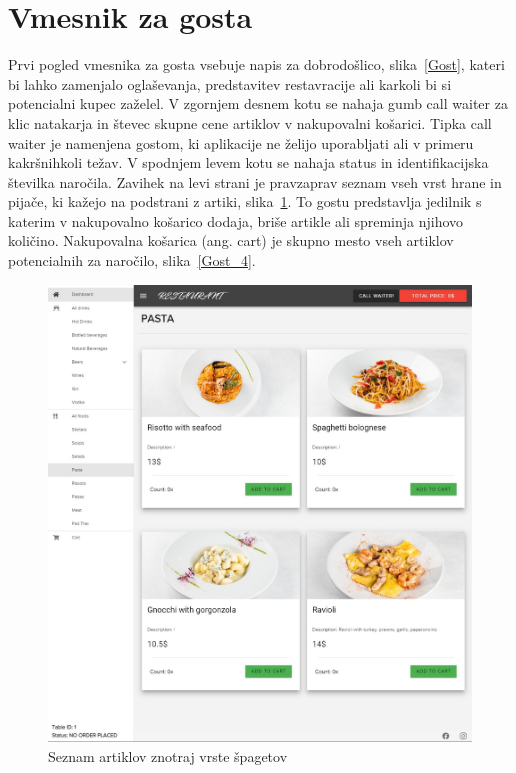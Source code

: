 \documentclass[a4paper, 12pt]{book}
\begin{document}
\section{Vmesnik za gosta}
Prvi pogled vmesnika za gosta vsebuje napis za dobrodošlico, slika~\ref{Gost}, kateri bi lahko zamenjalo oglaševanja, predstavitev restavracije ali karkoli bi si potencialni kupec zaželel. V zgornjem desnem kotu se nahaja gumb call waiter za klic natakarja in števec skupne cene artiklov v nakupovalni košarici. Tipka call waiter je namenjena gostom, ki aplikacije ne želijo uporabljati ali v primeru kakršnihkoli težav. V spodnjem levem kotu se nahaja status in identifikacijska številka naročila. Zavihek na levi strani je pravzaprav seznam vseh vrst hrane in pijače, ki kažejo na podstrani z artiki, slika~\ref{Gost_3}. To gostu predstavlja jedilnik s katerim v nakupovalno košarico dodaja, briše artikle ali spreminja njihovo količino. Nakupovalna košarica (ang. cart) je skupno mesto vseh artiklov potencialnih za naročilo, slika~\ref{Gost_4}.

\begin{figure}[!htb]
\begin{center}
\includegraphics[width=12.5cm]{gost_3.jpg}
\caption{Seznam artiklov znotraj vrste špagetov}
\label{Gost_3}
\end{center}
\end{figure}
\end{document}
